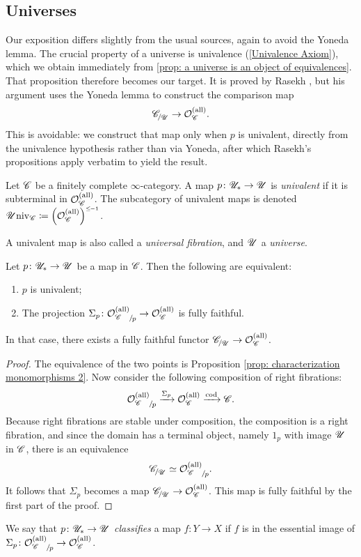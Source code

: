 \documentclass[twoside,a4paper,11pt]{amsart}
\begin{document}
\subsection{Universes}\label{subsection: universes}
Our exposition differs slightly from the usual sources, again to avoid the Yoneda lemma. The crucial property of a universe is univalence (\cref{Univalence Axiom}), which we obtain immediately from \cref{prop: a universe is an object of equivalences}. That proposition therefore becomes our target. It is proved by Rasekh \cite[Lemma~2.12]{Rasekh_UnivalenceHigherCategoryTheory}, but his argument uses the Yoneda lemma to construct the comparison map \[\slice{\C}{\U}\to\Orb_\C^{(\mathrm{all})}.\] This is avoidable: we construct that map only when $p$ is univalent, directly from the univalence hypothesis rather than via
Yoneda, after which Rasekh's propositions apply verbatim to yield the result.
\begin{definition}\label{def: univalent map}
Let $\mathscr{C}$ be a finitely complete $\infty$-category. A map $p\colon \mathscr{U}_\ast\to\mathscr{U}$ is \textit{univalent} if it is subterminal in $\mathcal{O}_{\mathscr{C}}^{(\mathrm{all})}$. The subcategory of univalent maps is denoted $\mathscr{U}\mathrm{niv}_{\mathscr{C}}\coloneq\left(\mathcal{O}_{\mathscr{C}}^{(\mathrm{all})}\right)^{\scriptscriptstyle\mathrel{\leq\mkern-1.8mu -1}}$.
\end{definition}
A univalent map is also called a \textit{universal fibration}, and $\mathscr{U}$ a \textit{universe}.
  \begin{prop}\label{prop: characterization of univalent map}
      Let $p\colon \mathscr{U}_\ast\to \mathscr{U}$ be a map in $\mathscr{C}$. Then the following are equivalent:
      \begin{enumerate}
          \item $p$ is univalent;
          \item The projection $\Sigma_p\colon \slice{\Orb_\C^{(\mathrm{all})}}{p}\to \Orb_\C^{(\mathrm{all})}$ is fully faithful.
      \end{enumerate}
      In that case, there exists a fully faithful functor $\slice{\C}{\U}\to\Orb_\C^{(\mathrm{all})}$.
  \end{prop}
  \begin{proof}
      The equivalence of the two points is Proposition \ref{prop: characterization monomorphisms 2}. Now consider the following composition of right fibrations:
      \[\slice{\Orb_\C^{(\mathrm{all})}}{p}\xrightarrow{\Sigma_p}\Orb_\C^{(\mathrm{all})}\xrightarrow{\mathrm{cod}}\C.\]
      Because right fibrations are stable under composition, the composition is a right fibration, and since the domain has a terminal object, namely $1_p$ with image $\mathscr{U}$ in $\mathscr{C}$, there is an equivalence \[\slice{\C}{\U}\simeq \slice{\Orb_\C^{(\mathrm{all})}}{p}.\]
      It follows that $\Sigma_p$ becomes a map $\slice{\C}{\U}\to\Orb_\C^{(\mathrm{all})}$. This map is fully faithful by the first part of the proof.
  \end{proof}
  \begin{definition}
      We say that $p\colon\mathscr{U}_\ast\to\mathscr{U}$ \textit{classifies} a map $f\colon Y\to X$ if $f$ is in the essential image of $\Sigma_p\colon \slice{\Orb_\C^{(\mathrm{all})}}{p}\to \Orb_\C^{(\mathrm{all})}$.
  \end{definition}
  
\end{document}
